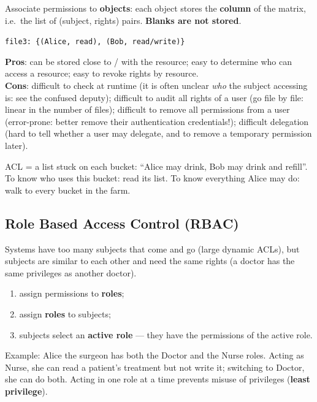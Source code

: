 \begin{defnbox}[title=Access Control List (ACL)]
Associate permissions to \textbf{objects}: each object stores the \textbf{column} of the
matrix, i.e.\ the list of (subject, rights) pairs. \textbf{Blanks are not stored}.
\begin{center}
\texttt{file3: \{(Alice, read), (Bob, read/write)\}}
\end{center}
\end{defnbox}

\begin{propbox}[title=ACLs: pros and cons]
\textbf{Pros}: can be stored close to / with the resource; easy to determine who can
access a resource; easy to revoke rights by resource. \\
\textbf{Cons}: difficult to check at runtime (it is often unclear \emph{who} the subject
accessing is: see the confused deputy); difficult to audit all rights of a user (go file by file:
linear in the number of files); difficult to remove all permissions from a user (error-prone:
better remove their authentication credentials!); difficult delegation (hard to tell whether a
user may delegate, and to remove a temporary permission later).
\end{propbox}

\begin{goatbox}
ACL = a list stuck on each bucket: ``Alice may drink, Bob may drink and refill''. To know who
uses this bucket: read its list. To know everything Alice may do: walk to every bucket in the
farm.
\end{goatbox}

\subsection{Role Based Access Control (RBAC)}

\begin{defnbox}[title=Role Based Access Control (RBAC)]
Systems have too many subjects that come and go (large dynamic ACLs), but subjects are
similar to each other and need the same rights (a doctor has the same privileges as
another doctor).
\begin{enumerate}
  \item assign permissions to \textbf{roles};
  \item assign \textbf{roles} to subjects;
  \item subjects select an \textbf{active role} --- they have the permissions of the
        active role.
\end{enumerate}
Example: Alice the surgeon has both the Doctor and the Nurse roles. Acting as Nurse, she can read
a patient's treatment but not write it; switching to Doctor, she can do both. Acting in one role
at a time prevents misuse of privileges (\textbf{least privilege}).
\end{defnbox}

